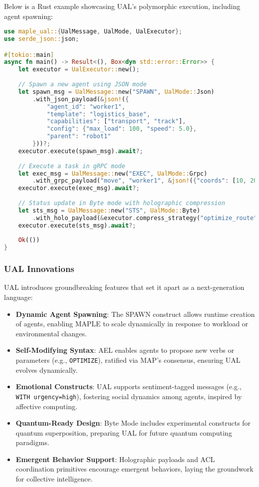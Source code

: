 \documentclass[a4paper,11pt]{article}
\begin{document}
Below is a Rust example showcasing UAL’s polymorphic execution, including agent spawning:
\begin{lstlisting}[language=Rust, caption={Rust UAL Example}, label={lst:ual-exec}]
use maple_ual::{UalMessage, UalMode, UalExecutor};
use serde_json::json;

#[tokio::main]
async fn main() -> Result<(), Box<dyn std::error::Error>> {
    let executor = UalExecutor::new();
    
    // Spawn a new agent using JSON mode
    let spawn_msg = UalMessage::new("SPAWN", UalMode::Json)
        .with_json_payload(&json!({
            "agent_id": "worker1",
            "template": "logistics_base",
            "capabilities": ["transport", "track"],
            "config": {"max_load": 100, "speed": 5.0},
            "parent": "robot1"
        }))?;
    executor.execute(spawn_msg).await?;
    
    // Execute a task in gRPC mode
    let exec_msg = UalMessage::new("EXEC", UalMode::Grpc)
        .with_grpc_payload("move", "worker1", &json!({"coords": [10, 20]}))?;
    executor.execute(exec_msg).await?;
    
    // Status update in Byte mode with holographic compression
    let sts_msg = UalMessage::new("STS", UalMode::Byte)
        .with_holo_payload(&executor.compress_strategy("optimize_route")?)?;
    executor.execute(sts_msg).await?;
    
    Ok(())
}
\end{lstlisting}
\vspace{0.5cm}

\subsubsection{UAL Innovations}
UAL introduces groundbreaking features that set it apart as a next-generation language:
\begin{itemize}[leftmargin=*]
    \item \textbf{Dynamic Agent Spawning}: The SPAWN construct allows runtime creation of agents, enabling MAPLE to scale dynamically in response to workload or environmental changes.
    \item \textbf{Self-Modifying Syntax}: AEL enables agents to propose new verbs or parameters (e.g., \texttt{OPTIMIZE}), ratified via MAP’s consensus, ensuring UAL evolves dynamically.
    \item \textbf{Emotional Constructs}: UAL supports sentiment-tagged messages (e.g., \texttt{WITH urgency=high}), fostering social dynamics among agents, inspired by affective computing.
    \item \textbf{Quantum-Ready Design}: Byte Mode includes experimental constructs for quantum superposition, preparing UAL for future quantum computing paradigms.
    \item \textbf{Emergent Behavior Support}: Holographic payloads and ACL coordination primitives encourage emergent behaviors, laying the groundwork for collective intelligence.
\end{itemize}
\end{document}
